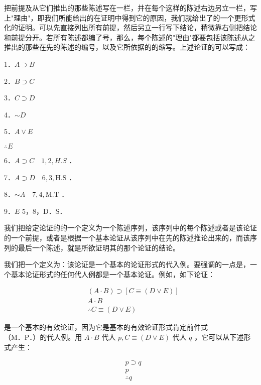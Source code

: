 把前提及从它们推出的那些陈述写在一栏，并在每个这样的陈述右边另立一栏，写上"理由"，即我们所能给出的在证明中得到它的原因，我们就给出了的一个更形式化的证明。可以先直接列出所有前提，然后另立一行写下结论，稍微靠右侧把结论和前提分开。若所有陈述都编了号，那么，每个陈述的"理由"都要包括该陈述从之推出的那些在先的陈述的编号，以及它所依据的的缩写。上述论证的可以写成：

\begin{examplebox}[title=形式证明的格式]
1．$A \supset B$

2．$B \supset C$

3．$C \supset D$

4．$\sim D$

5．$A \vee E$

$\therefore E$

6．$A \supset C \quad 1,2, H . S$ ．

7．$A \supset D \quad 6,3, \mathrm{H} . \mathrm{S}$ ．

8．$\sim A \quad 7,4, \mathrm{M} . \mathrm{T}$ ．

9．$E$ 5，8，D．S．
\end{examplebox}

\begin{theorembox}[title=形式证明的定义]
我们把给定论证的的一个定义为一个陈述序列，该序列中的每个陈述或者是该论证的一个前提，或者是根据一个基本论证从该序列中在先的陈述推论出来的，而该序列的最后一个陈述，就是所欲证明其的那个论证的结论。
\end{theorembox}

我们把一个定义为：该论证是一个基本的论证形式的代入例。要强调的一点是，一个基本论证形式的任何代人例都是一个基本论证。例如，如下论证：

$$
\begin{aligned}
& (A \cdot B) \supset[C \equiv(D \vee E)] \\
& A \cdot B \\
& \therefore C \equiv(D \vee E)
\end{aligned}
$$

是一个基本的有效论证，因为它是基本的有效论证形式肯定前件式\\
（M．P．）的代人例。用 $A \cdot B$ 代人 $p, C \equiv(D \vee E)$ 代人 $q$ ，它可以从下述形式产生：

$$
\begin{aligned}
& p \supset q \\
& p \\
& \therefore q
\end{aligned}
$$

